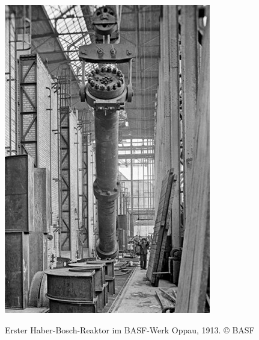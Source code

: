 \begin{figurehere}
	\begin{center}
		 \includegraphics[width=.4\linewidth]{./Bilder/2.0.Stickstoff_Reduktion/Bild2.jpg} 
		 \caption{Erster Haber-Bosch-Reaktor im BASF-Werk Oppau, 1913. © BASF}
	\end{center}
\end{figurehere}


%
